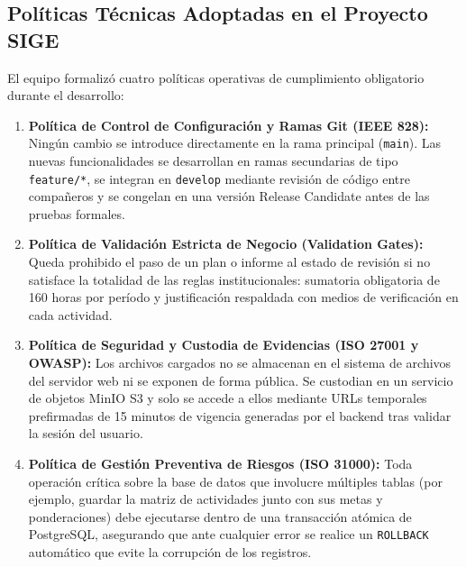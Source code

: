 \documentclass[12pt,a4paper]{article}
\begin{document}
\subsection{Políticas Técnicas Adoptadas en el Proyecto SIGE}
El equipo formalizó cuatro políticas operativas de cumplimiento obligatorio durante el desarrollo:

\begin{enumerate}[leftmargin=1.5em, itemsep=2pt]
    \item \textbf{Política de Control de Configuración y Ramas Git (IEEE 828):} Ningún cambio se introduce directamente en la rama principal (\texttt{main}). Las nuevas funcionalidades se desarrollan en ramas secundarias de tipo \texttt{feature/*}, se integran en \texttt{develop} mediante revisión de código entre compañeros y se congelan en una versión Release Candidate antes de las pruebas formales.
    \item \textbf{Política de Validación Estricta de Negocio (Validation Gates):} Queda prohibido el paso de un plan o informe al estado de revisión si no satisface la totalidad de las reglas institucionales: sumatoria obligatoria de 160 horas por período y justificación respaldada con medios de verificación en cada actividad.
    \item \textbf{Política de Seguridad y Custodia de Evidencias (ISO 27001 y OWASP):} Los archivos cargados no se almacenan en el sistema de archivos del servidor web ni se exponen de forma pública. Se custodian en un servicio de objetos MinIO S3 y solo se accede a ellos mediante URLs temporales prefirmadas de 15 minutos de vigencia generadas por el backend tras validar la sesión del usuario.
    \item \textbf{Política de Gestión Preventiva de Riesgos (ISO 31000):} Toda operación crítica sobre la base de datos que involucre múltiples tablas (por ejemplo, guardar la matriz de actividades junto con sus metas y ponderaciones) debe ejecutarse dentro de una transacción atómica de PostgreSQL, asegurando que ante cualquier error se realice un \texttt{ROLLBACK} automático que evite la corrupción de los registros.
\end{enumerate}
\end{document}
